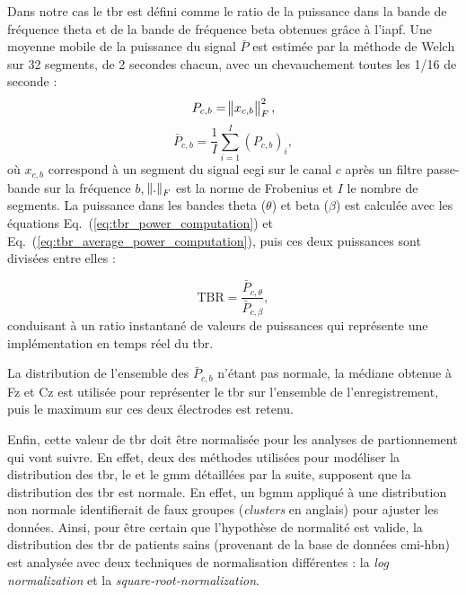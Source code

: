 Dans notre cas le \gls{tbr} est défini comme le ratio de la puissance dans la bande de fréquence theta et de la bande de fréquence beta obtenues 
grâce à l'\gls{iapf}. Une moyenne mobile de la puissance du signal $\bar{P}$ est estimée par la méthode de Welch \citep{Welch1967} sur 32 segments, de 2 secondes chacun, avec un 
chevauchement toutes les 1/16 de seconde :
\begin{equation}
\label{eq:tbr_power_computation}
P_{c,b} = \norm{ x_{c,b} }_{F}^2,
\end{equation}
\begin{equation}
\label{eq:tbr_average_power_computation}
\bar{P}_{c,b} = \frac{1}{I} \sum_{i=1}^{I} (P_{c,b})_{i},
\end{equation}
où $x_{c,b}$ correspond à un segment du signal \gls{eegi} sur le canal $c$ après un filtre passe-bande sur la fréquence $b$, $\norm{.}_{F}$ est la norme de Frobenius et $I$ 
le nombre de segments. La puissance dans les bandes theta ($\theta$) et beta ($\beta$) est calculée avec les équations Eq.~(\ref{eq:tbr_power_computation}) et Eq.~(\ref{eq:tbr_average_power_computation}),
puis ces deux puissances sont divisées entre elles :

\begin{equation}
\label{eq:tbr_tbr_computation}
\text{TBR} = \frac{\bar{P}_{c,\theta}}{\bar{P}_{c,\beta}},
\end{equation}
conduisant à un ratio instantané de valeurs de puissances qui représente une implémentation en temps réel du \gls{tbr}.

La distribution de l'ensemble des $\bar{P}_{c,b}$ n'étant pas normale, la médiane obtenue à Fz et Cz est utilisée pour représenter le \gls{tbr} sur l'ensemble 
de l'enregistrement, puis le maximum sur ces deux électrodes est retenu.

Enfin, cette valeur de \gls{tbr} doit être normalisée pour les analyses de partionnement qui vont suivre. En effet, deux des méthodes utilisées pour modéliser la distribution des \gls{tbr},
le  et le \gls{gmm} détaillées par la suite, supposent que la distribution des \gls{tbr} est normale. 
En effet, un \gls{bgmm} appliqué à une distribution non normale identifierait de faux groupes (\textit{clusters} en anglais) pour ajuster les données. 
Ainsi, pour être certain que l'hypothèse de normalité est valide, la distribution des \gls{tbr} de patients sains (provenant de la base de données \gls{cmi-hbn})
est analysée avec deux techniques de normalisation différentes : la \textit{log normalization} et la \textit{square-root-normalization}.

